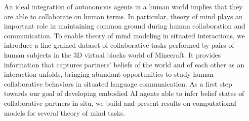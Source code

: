 An ideal integration of autonomous agents in a human world implies that they are able to collaborate on human terms. In particular, theory of mind plays an important role in maintaining common ground during human collaboration and communication. To enable theory of mind modeling in situated interactions, we introduce a fine-grained  dataset of collaborative tasks performed by pairs of human subjects in the 3D virtual blocks world of Minecraft. It provides information that captures partners' beliefs of the world and of each other as an interaction unfolds, bringing abundant opportunities to study human collaborative behaviors in situated language communication. As a first step towards our goal of developing embodied AI agents able to infer belief states of collaborative partners in situ, we build and present results on computational models for several theory of mind tasks.

